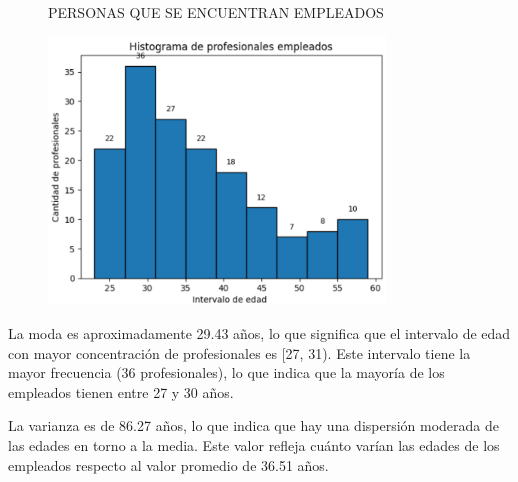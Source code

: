 \documentclass[12pt, a4paper]{article}
\begin{document}
\begin{enumerate}
\begin{enumerate}
\begin{figure}[H]
\begin{center}
            \end{center}
            \label{fig:frecuenciaempleados}
            \caption{PERSONAS QUE SE ENCUENTRAN EMPLEADOS}
        \end{figure}
        \begin{figure}[H]
            \begin{center}
                \includegraphics[width=0.80\textwidth]{images/HistogramEmpleados.png}
            \end{center}
            \label{fig:HistogramEmpleados}
        \end{figure}
        La moda es aproximadamente 29.43 años, lo que significa que el intervalo de edad con mayor concentración de profesionales es [27, 31). Este intervalo tiene la mayor frecuencia (36 profesionales), lo que indica que la mayoría de los empleados tienen entre 27 y 30 años.

        La varianza es de 86.27 años, lo que indica que hay una dispersión moderada de las edades en torno a la media. Este valor refleja cuánto varían las edades de los empleados respecto al valor promedio de 36.51 años.


\end{enumerate}
\end{enumerate}
\end{document}
